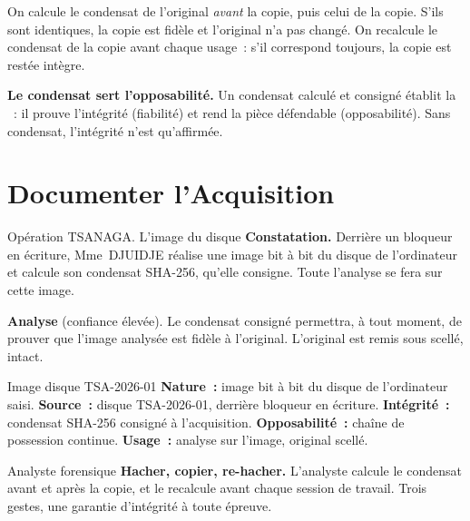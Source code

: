 On calcule le condensat de l'original \emph{avant} la copie, puis celui de la
copie. S'ils sont identiques, la copie est fidèle et l'original n'a pas
changé. On recalcule le condensat de la copie avant chaque usage~: s'il
correspond toujours, la copie est restée intègre.

\begin{boxCRO}
\textbf{Le condensat sert l'opposabilité.} Un condensat calculé et consigné
établit la ~: il prouve l'intégrité (fiabilité) et rend la pièce
défendable (opposabilité). Sans condensat, l'intégrité n'est qu'affirmée.
\end{boxCRO}

\section{Documenter l'Acquisition}
\label{sec:c08-documenter}

\begin{boxscenario}{Opération TSANAGA. L'image du disque}
\textbf{Constatation.} Derrière un bloqueur en écriture, Mme~DJUIDJE réalise
une image bit à bit du disque de l'ordinateur et calcule son condensat
SHA-256, qu'elle consigne. Toute l'analyse se fera sur cette image.

\medskip
\textbf{Analyse} (confiance élevée). Le condensat consigné permettra, à tout
moment, de prouver que l'image analysée est fidèle à l'original. L'original
est remis sous scellé, intact.
\end{boxscenario}

\begin{boxobjet}{Image disque TSA-2026-01}
\textbf{Nature~:} image bit à bit du disque de l'ordinateur saisi.
\textbf{Source~:} disque TSA-2026-01, derrière bloqueur en écriture.
\textbf{Intégrité~:} condensat SHA-256 consigné à l'acquisition.
\textbf{Opposabilité~:} chaîne de possession continue. \textbf{Usage~:}
analyse sur l'image, original scellé.
\end{boxobjet}

\begin{boxmetier}{Analyste forensique}
\textbf{Hacher, copier, re-hacher.} L'analyste calcule le condensat avant et
après la copie, et le recalcule avant chaque session de travail. Trois
gestes, une garantie d'intégrité à toute épreuve.
\end{boxmetier}

